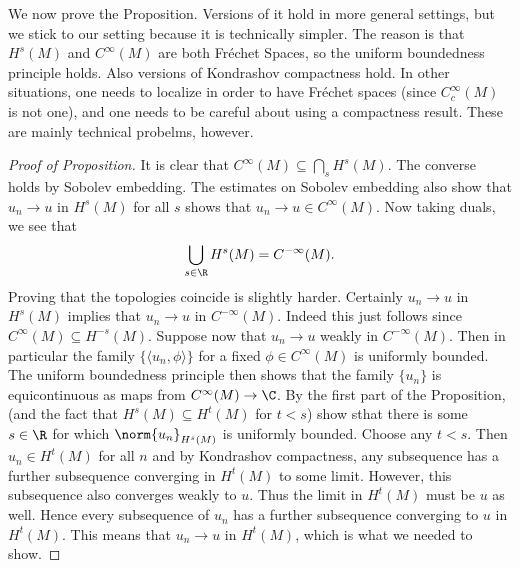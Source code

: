 \documentclass[12pt]{article}
\begin{document}
We now prove the Proposition. Versions of it hold in more general settings, but we stick to our setting because it is technically simpler. The reason is that $H^s(M)$ and $C^\infty(M)$ are both Fr\'echet Spaces, so the uniform boundedness principle holds. Also versions of Kondrashov compactness hold. In other situations, one needs to localize in order to have Fr\'echet spaces (since $C_c^\infty(M)$ is not one), and one needs to be careful about using a compactness result. These are mainly technical probelms, however.
\begin{proof}[Proof of Proposition]It is clear that $C^\infty(M) \subseteq \bigcap_{s} H^s(M)$. The converse holds by Sobolev embedding. The estimates on Sobolev embedding also show that $u_n \to u$ in $H^s(M)$ for all $s$ shows that $u_n \to u \in C^\infty(M)$. Now taking duals, we see that
\[\bigcup_{s \in \R} H^s(M) = C^{-\infty}(M).\]
Proving that the topologies coincide is slightly harder. Certainly $u_n \to u$ in $H^s(M)$ implies that $u_n \to u$ in $C^{-\infty}(M)$. Indeed this just follows since $C^\infty(M) \subseteq H^{-s}(M)$. Suppose now that $u_n \to u$ weakly in $C^{-\infty}(M)$. Then in particular the family $\{\langle u_n,\phi\rangle\}$ for a fixed $\phi \in C^\infty(M)$ is uniformly bounded. The uniform boundedness principle then shows that the family $\{u_n\}$ is equicontinuous as maps from $C^\infty(M) \to \C$. By the first part of the Proposition, (and the fact that $H^s(M) \subseteq H^t(M)$ for $t < s$) show sthat there is some $s \in \R$ for which $\norm{u_n}_{H^s(M)}$ is uniformly bounded. Choose any $t < s$. Then $u_n \in H^t(M)$ for all $n$ and by Kondrashov compactness, any subsequence has a further subsequence converging in $H^t(M)$ to some limit. However, this subsequence also converges weakly to $u$. Thus the limit in $H^t(M)$ must be $u$ as well. Hence every subsequence of $u_n$ has a further subsequence converging to $u$ in $H^t(M)$. This means that $u_n \to u$ in $H^t(M)$, which is what we needed to show.\end{proof}
\end{document}

